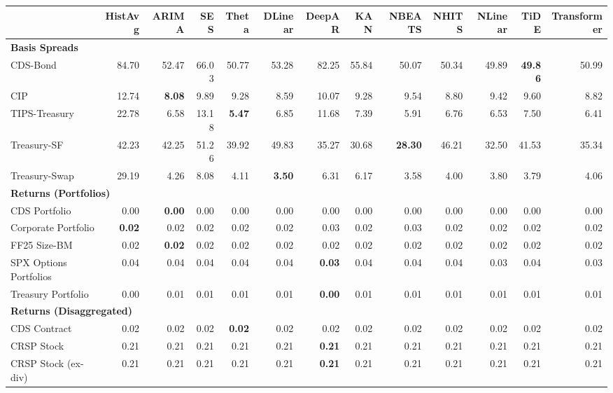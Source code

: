 \scriptsize
\setlength{\tabcolsep}{1.5pt}
\renewcommand{\arraystretch}{0.9}
\begin{tabular}{@{}lrrrrrrrrrrrr@{}}
\toprule
 & HistAvg & ARIMA & SES & Theta & DLinear & DeepAR & KAN & NBEATS & NHITS & NLinear & TiDE & Transformer \\
\midrule
\multicolumn{13}{l}{\textbf{Basis Spreads}} \\
CDS-Bond & 84.70 & 52.47 & 66.03 & 50.77 & 53.28 & 82.25 & 55.84 & 50.07 & 50.34 & 49.89 & \textbf{49.86} & 50.99 \\
CIP & 12.74 & \textbf{8.08} & 9.89 & 9.28 & 8.59 & 10.07 & 9.28 & 9.54 & 8.80 & 9.42 & 9.60 & 8.82 \\
TIPS-Treasury & 22.78 & 6.58 & 13.18 & \textbf{5.47} & 6.85 & 11.68 & 7.39 & 5.91 & 6.76 & 6.53 & 7.50 & 6.41 \\
Treasury-SF & 42.23 & 42.25 & 51.26 & 39.92 & 49.83 & 35.27 & 30.68 & \textbf{28.30} & 46.21 & 32.50 & 41.53 & 35.34 \\
Treasury-Swap & 29.19 & 4.26 & 8.08 & 4.11 & \textbf{3.50} & 6.31 & 6.17 & 3.58 & 4.00 & 3.80 & 3.79 & 4.06 \\
\midrule
\multicolumn{13}{l}{\textbf{Returns (Portfolios)}} \\
CDS Portfolio & 0.00 & \textbf{0.00} & 0.00 & 0.00 & 0.00 & 0.00 & 0.00 & 0.00 & 0.00 & 0.00 & 0.00 & 0.00 \\
Corporate Portfolio & \textbf{0.02} & 0.02 & 0.02 & 0.02 & 0.02 & 0.03 & 0.02 & 0.03 & 0.02 & 0.02 & 0.02 & 0.02 \\
FF25 Size-BM & 0.02 & \textbf{0.02} & 0.02 & 0.02 & 0.02 & 0.02 & 0.02 & 0.02 & 0.02 & 0.02 & 0.02 & 0.02 \\
SPX Options Portfolios & 0.04 & 0.04 & 0.04 & 0.04 & 0.04 & \textbf{0.03} & 0.04 & 0.04 & 0.04 & 0.03 & 0.04 & 0.03 \\
Treasury Portfolio & 0.00 & 0.01 & 0.01 & 0.01 & 0.01 & \textbf{0.00} & 0.01 & 0.01 & 0.01 & 0.01 & 0.01 & 0.01 \\
\midrule
\multicolumn{13}{l}{\textbf{Returns (Disaggregated)}} \\
CDS Contract & 0.02 & 0.02 & 0.02 & \textbf{0.02} & 0.02 & 0.02 & 0.02 & 0.02 & 0.02 & 0.02 & 0.02 & 0.02 \\
CRSP Stock & 0.21 & 0.21 & 0.21 & 0.21 & 0.21 & \textbf{0.21} & 0.21 & 0.21 & 0.21 & 0.21 & 0.21 & 0.21 \\
CRSP Stock (ex-div) & 0.21 & 0.21 & 0.21 & 0.21 & 0.21 & \textbf{0.21} & 0.21 & 0.21 & 0.21 & 0.21 & 0.21 & 0.21 \\

\end{tabular}
